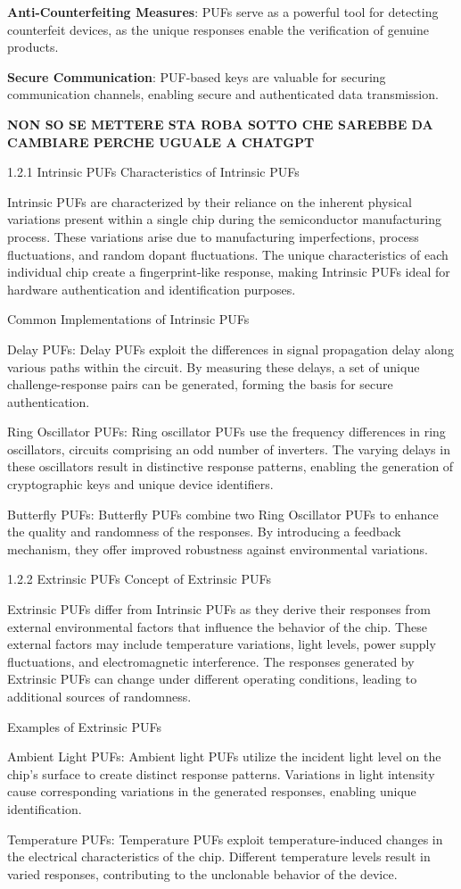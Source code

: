 \documentclass{article}
\begin{document}
\textbf{Anti-Counterfeiting Measures}: PUFs serve as a powerful tool for detecting counterfeit devices, as the unique responses enable the verification of genuine products.


\textbf{Secure Communication}: PUF-based keys are valuable for securing communication channels, enabling secure and authenticated data transmission.


\textbf{NON SO SE METTERE STA ROBA SOTTO CHE SAREBBE DA CAMBIARE PERCHE UGUALE A CHATGPT}


1.2.1 Intrinsic PUFs
Characteristics of Intrinsic PUFs

Intrinsic PUFs are characterized by their reliance on the inherent physical variations present within a single chip during the semiconductor manufacturing process. These variations arise due to manufacturing imperfections, process fluctuations, and random dopant fluctuations. The unique characteristics of each individual chip create a fingerprint-like response, making Intrinsic PUFs ideal for hardware authentication and identification purposes.

Common Implementations of Intrinsic PUFs

Delay PUFs: Delay PUFs exploit the differences in signal propagation delay along various paths within the circuit. By measuring these delays, a set of unique challenge-response pairs can be generated, forming the basis for secure authentication.

Ring Oscillator PUFs: Ring oscillator PUFs use the frequency differences in ring oscillators, circuits comprising an odd number of inverters. The varying delays in these oscillators result in distinctive response patterns, enabling the generation of cryptographic keys and unique device identifiers.

Butterfly PUFs: Butterfly PUFs combine two Ring Oscillator PUFs to enhance the quality and randomness of the responses. By introducing a feedback mechanism, they offer improved robustness against environmental variations.


1.2.2 Extrinsic PUFs
Concept of Extrinsic PUFs

Extrinsic PUFs differ from Intrinsic PUFs as they derive their responses from external environmental factors that influence the behavior of the chip. These external factors may include temperature variations, light levels, power supply fluctuations, and electromagnetic interference. The responses generated by Extrinsic PUFs can change under different operating conditions, leading to additional sources of randomness.

Examples of Extrinsic PUFs

Ambient Light PUFs: Ambient light PUFs utilize the incident light level on the chip's surface to create distinct response patterns. Variations in light intensity cause corresponding variations in the generated responses, enabling unique identification.

Temperature PUFs: Temperature PUFs exploit temperature-induced changes in the electrical characteristics of the chip. Different temperature levels result in varied responses, contributing to the unclonable behavior of the device.
\end{document}
